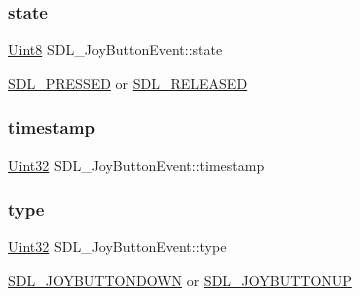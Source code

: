 \subsubsection{\texorpdfstring{state}{state}}
{\footnotesize\ttfamily \hyperlink{_s_d_l__stdinc_8h_a2944638813a090aa23e62f4da842c3e2}{Uint8} S\+D\+L\+\_\+\+Joy\+Button\+Event\+::state}

\hyperlink{_s_d_l__events_8h_aee81bbffbc8489bdea8fecd1232c4bd1}{S\+D\+L\+\_\+\+P\+R\+E\+S\+S\+ED} or \hyperlink{_s_d_l__events_8h_ad680a069f9fcab80de91b3eefdf29c3c}{S\+D\+L\+\_\+\+R\+E\+L\+E\+A\+S\+ED} \mbox{\label{struct_s_d_l___joy_button_event_ab50b6f7d1ab3ac53df69fc2d6cf5fa2a}} 
\subsubsection{\texorpdfstring{timestamp}{timestamp}}
{\footnotesize\ttfamily \hyperlink{_s_d_l__stdinc_8h_add440eff171ea5f55cb00c4a9ab8672d}{Uint32} S\+D\+L\+\_\+\+Joy\+Button\+Event\+::timestamp}

\mbox{\label{struct_s_d_l___joy_button_event_a8f3312a046d37fa2884b93f69c4cb655}} 
\subsubsection{\texorpdfstring{type}{type}}
{\footnotesize\ttfamily \hyperlink{_s_d_l__stdinc_8h_add440eff171ea5f55cb00c4a9ab8672d}{Uint32} S\+D\+L\+\_\+\+Joy\+Button\+Event\+::type}

\hyperlink{_s_d_l__events_8h_a3b589e89be6b35c02e0dd34a55f3fccaa386ac978bc145a45883fe0adab70710b}{S\+D\+L\+\_\+\+J\+O\+Y\+B\+U\+T\+T\+O\+N\+D\+O\+WN} or \hyperlink{_s_d_l__events_8h_a3b589e89be6b35c02e0dd34a55f3fccaa76f91c81110f012e3a47cbbc0449e3c3}{S\+D\+L\+\_\+\+J\+O\+Y\+B\+U\+T\+T\+O\+N\+UP} \mbox{\label{struct_s_d_l___joy_button_event_a1679049adad7242b28420948fdc79044}} 
